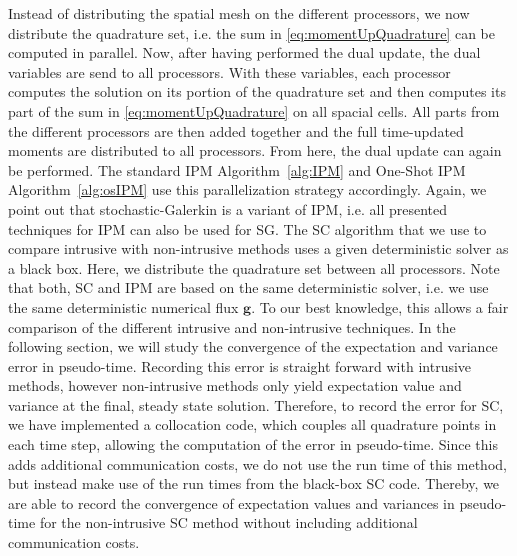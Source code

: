 Instead of distributing the spatial mesh on the different processors, we now distribute the quadrature set, i.e. the sum in \eqref{eq:momentUpQuadrature} can be computed in parallel. Now, after having performed the dual update, the dual variables are send to all processors. With these variables, each processor computes the solution on its portion of the quadrature set and then computes its part of the sum in \eqref{eq:momentUpQuadrature} on all spacial cells. All parts from the different processors are then added together and the full time-updated moments are distributed to all processors. From here, the dual update can again be performed. The standard IPM Algorithm~\ref{alg:IPM} and One-Shot IPM Algorithm~\ref{alg:osIPM} use this parallelization strategy accordingly. Again, we point out that stochastic-Galerkin is a variant of IPM, i.e. all presented techniques for IPM can also be used for SG. The SC algorithm that we use to compare intrusive with non-intrusive methods uses a given deterministic solver as a black box. Here, we distribute the quadrature set between all processors. Note that both, SC and IPM are based on the same deterministic solver, i.e. we use the same deterministic numerical flux $\bm g$. To our best knowledge, this allows a fair comparison of the different intrusive and non-intrusive techniques. In the following section, we will study the convergence of the expectation and variance error in pseudo-time. Recording this error is straight forward with intrusive methods, however non-intrusive methods only yield expectation value and variance at the final, steady state solution. Therefore, to record the error for SC, we have implemented a collocation code, which couples all quadrature points in each time step, allowing the computation of the error in pseudo-time. Since this adds additional communication costs, we do not use the run time of this method, but instead make use of the run times from the black-box SC code. Thereby, we are able to record the convergence of expectation values and variances in pseudo-time for the non-intrusive SC method without including additional communication costs.
